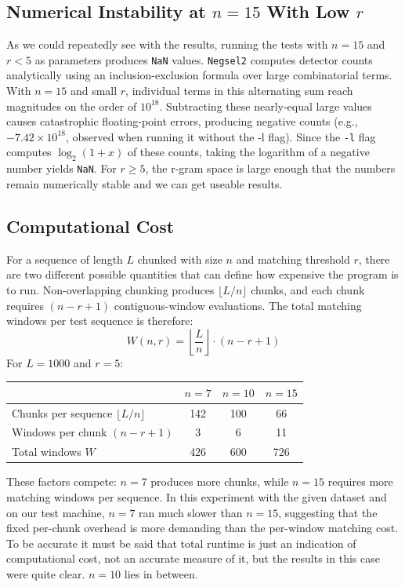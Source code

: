 \documentclass{article}
\begin{document}
\subsection{Numerical Instability at $n=15$ With Low $r$}

As we could repeatedly see with the results, running the tests with $n=15$ and $r<5$ as parameters produces \texttt{NaN} values. \texttt{Negsel2} computes detector counts analytically using an inclusion-exclusion formula over large combinatorial terms. With $n=15$ and small $r$, individual terms in this alternating sum reach magnitudes on the order of $10^{18}$. Subtracting these nearly-equal large values causes catastrophic floating-point errors, producing negative counts (e.g., $-7.42 \times 10^{18}$, observed when running it without the -l flag). Since the \texttt{-l} flag computes $\log_2(1+x)$ of these counts, taking the logarithm of a negative number yields \texttt{NaN}. For $r \geq 5$, the r-gram space is large enough that the numbers remain numerically stable and we can get useable results.


\subsection{Computational Cost}
For a sequence of length $L$ chunked with size $n$ and matching threshold $r$, there are two different possible quantities that can define how expensive the program is to run. Non-overlapping chunking produces $\lfloor L/n \rfloor$ chunks, and each chunk requires $(n - r + 1)$ contiguous-window evaluations. The total matching windows per test sequence is therefore:
\begin{equation}
    W(n, r) = \left\lfloor \frac{L}{n} \right\rfloor \cdot (n - r + 1)
\end{equation}
For $L = 1000$ and $r = 5$:

\begin{center}
\begin{tabular}{l c c c}
\hline
 & $n=7$ & $n=10$ & $n=15$ \\
\hline
Chunks per sequence $\lfloor L/n \rfloor$ & 142 & 100 & 66 \\
Windows per chunk $(n-r+1)$ & 3 & 6 & 11 \\
Total windows $W$ & 426 & 600 & 726 \\
\hline
\end{tabular}
\end{center}

These factors compete: $n=7$ produces more chunks, while $n=15$ requires more matching windows per sequence. In this experiment with the given dataset and on our test machine, $n=7$ ran much slower than $n=15$, suggesting that the fixed per-chunk overhead is more demanding than the per-window matching cost. To be accurate it must be said that total runtime is just an indication of computational cost, not an accurate measure of it, but the results in this case were quite clear. $n=10$ lies in between.
\end{document}
